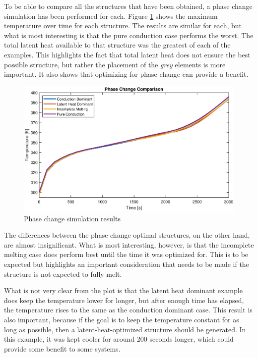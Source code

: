 To be able to compare all the structures that have been obtained, a phase change simulation has been performed for each. Figure \ref{fig:phase_change_optimal_comparison} shows the maximum temperature over time for each structure. The results are similar for each, but what is most interesting is that the pure conduction case performs the worst. The total latent heat available to that structure was the greatest of each of the examples. This highlights the fact that total latent heat does not ensure the best possible structure, but rather the placement of the \emph{grey} elements is more important. It also shows that optimizing for phase change can provide a benefit. 
\begin{figure}[ht]
  \centering
  \includegraphics[width=0.8\linewidth]{figures/chapter_4/PhaseChangePhaseChangeComparison.eps}
  \caption{Phase change simulation results}
  \label{fig:phase_change_optimal_comparison}
\end{figure}

The differences between the phase change optimal structures, on the other hand, are almost insignificant. What is most interesting, however, is that the incomplete melting case does perform best until the time it was optimized for. This is to be expected but highlights an important consideration that needs to be made if the structure is not expected to fully melt.

What is not very clear from the plot is that the latent heat dominant example does keep the temperature lower for longer, but after enough time has elapsed, the temperature rises to the same as the conduction dominant case. This result is also important, because if the goal is to keep the temperature constant for as long as possible, then a latent-heat-optimized structure should be generated. In this example, it was kept cooler for around 200 seconds longer, which could provide some benefit to some systems.

